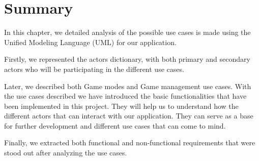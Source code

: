 \FloatBarrier

\section{Summary}
In this chapter, we detailed analysis of the possible use cases is made using the Unified Modeling Language (UML) for our application.

Firstly, we represented the actors dictionary, with both primary and secondary actors who will be participating in the different use cases.

Later, we described both Game modes and Game management use cases. With the use cases described we have introduced the basic functionalities that have been implemented in this project. They will help us to understand how the different actors that can interact with our application. They can serve as a base for further development and different use cases that can come to mind.

Finally, we extracted both functional and non-functional requirements that were stood out after analyzing the use cases.
